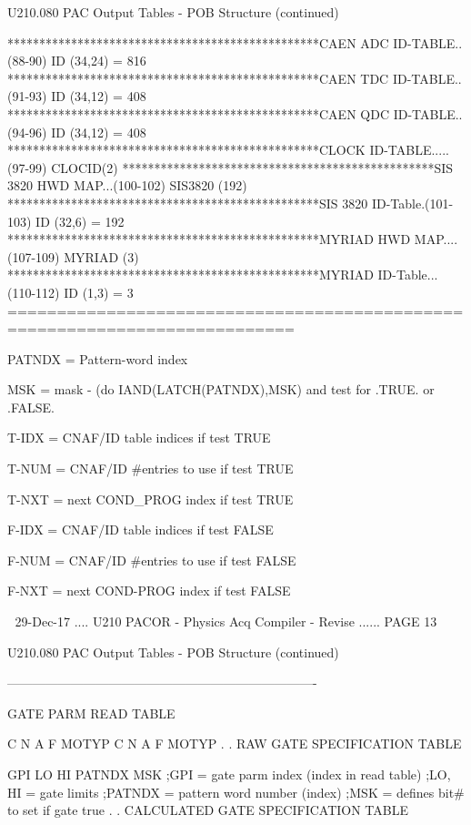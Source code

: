  
 
   U210.080  PAC Output Tables - POB Structure (continued)
 
 
   *************************************************CAEN ADC ID-TABLE..(88-90)
   ID (34,24) = 816
   *************************************************CAEN TDC ID-TABLE..(91-93)
   ID (34,12) = 408
   *************************************************CAEN QDC ID-TABLE..(94-96)
   ID (34,12) = 408
   *************************************************CLOCK ID-TABLE.....(97-99)
   CLOCID(2)
   *************************************************SIS 3820 HWD MAP...(100-102)
   SIS3820 (192)
   *************************************************SIS 3820 ID-Table.(101-103)
   ID (32,6) = 192
   *************************************************MYRIAD HWD MAP....(107-109)
   MYRIAD (3)
   *************************************************MYRIAD ID-Table...(110-112)
   ID (1,3) = 3
   ===========================================================================
 
 
   PATNDX = Pattern-word index
 
   MSK    = mask - (do IAND(LATCH(PATNDX),MSK) and test for .TRUE. or .FALSE.
 
   T-IDX  = CNAF/ID table indices     if test TRUE
 
   T-NUM  = CNAF/ID #entries to use   if test TRUE
 
   T-NXT  = next COND_PROG index      if test TRUE
 
   F-IDX  = CNAF/ID table indices     if test FALSE
 
   F-NUM  = CNAF/ID #entries to use   if test FALSE
 
   F-NXT  = next COND-PROG index      if test FALSE
 
    
   29-Dec-17 .... U210  PACOR -  Physics Acq Compiler - Revise ...... PAGE  13
 
 
   U210.080  PAC Output Tables - POB Structure (continued)
 
   -------------------------------------------------------------------------
 
   GATE PARM READ TABLE
 
   C  N  A  F  MOTYP
   C  N  A  F  MOTYP
   .
   .
   RAW GATE SPECIFICATION TABLE
 
   GPI LO HI PATNDX MSK  ;GPI    = gate parm index (index in read table)
                         ;LO, HI = gate limits
                         ;PATNDX = pattern word number (index)
                         ;MSK    = defines bit# to set if gate true
   .
   .
   CALCULATED GATE SPECIFICATION TABLE
 
